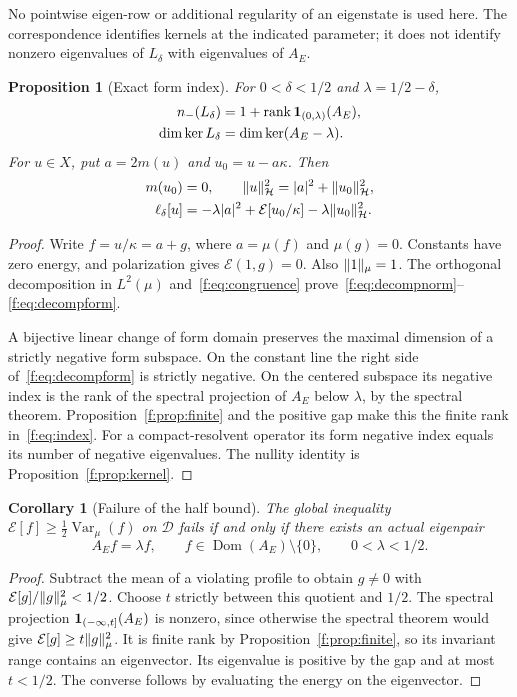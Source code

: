 \documentclass[11pt,a4paper]{article}
\numberwithin{equation}{section}
\newtheorem{proposition}[theorem]{Proposition}
\newtheorem{corollary}[theorem]{Corollary}
\theoremstyle{definition}\newtheorem{definition}[theorem]{Definition}
\theoremstyle{remark}\newtheorem{remark}[theorem]{Remark}
\newcommand{\E}{\mathcal E}\newcommand{\D}{\mathcal D}
\newcommand{\Hh}{\mathcal H}\newcommand{\Hw}{\mathcal H}
\newcommand{\dom}{\operatorname{Dom}}\newcommand{\Var}{\operatorname{Var}}
\newcommand{\rank}{\operatorname{rank}}\newcommand{\ess}{\operatorname{ess}}\newcommand{\supp}{\operatorname{supp}}
\begin{document}
No pointwise eigen-row or additional regularity of an eigenstate is used here. The correspondence identifies kernels at the indicated parameter; it does not identify nonzero eigenvalues of $L_\delta$ with eigenvalues of $A_E$.

\begin{proposition}[Exact form index]\label{f:prop:index}
For $0<\delta<1/2$ and $\lambda=1/2-\delta$,
\begin{align}
 n_-(L_\delta)&=1+\rank\one_{(0,\lambda)}(A_E),\label{f:eq:index}\\
 \dim\ker L_\delta&=\dim\ker(A_E-\lambda).\label{f:eq:nullity}
\end{align}
For $u\in X$, put $a=2m(u)$ and $u_0=u-a\kappa$. Then
\begin{align}
 m(u_0)&=0,\qquad
 \norm{u}_{\Hh}^2=|a|^2+\norm{u_0}_{\Hh}^2,\label{f:eq:decompnorm}\\
 \ell_\delta[u]&=-\lambda|a|^2+
              \E[u_0/\kappa]-\lambda\norm{u_0}_{\Hh}^2.\label{f:eq:decompform}
\end{align}
\end{proposition}
\begin{proof}
Write $f=u/\kappa=a+g$, where $a=\mu(f)$ and $\mu(g)=0$. Constants have zero energy, and polarization gives $\E(1,g)=0$. Also $\lVert1\rVert_\mu=1$. The orthogonal decomposition in $L^2(\mu)$ and~\eqref{f:eq:congruence} prove~\eqref{f:eq:decompnorm}--\eqref{f:eq:decompform}.

A bijective linear change of form domain preserves the maximal dimension of a strictly negative form subspace. On the constant line the right side of~\eqref{f:eq:decompform} is strictly negative. On the centered subspace its negative index is the rank of the spectral projection of $A_E$ below $\lambda$, by the spectral theorem. Proposition~\ref{f:prop:finite} and the positive gap make this the finite rank in~\eqref{f:eq:index}. For a compact-resolvent operator its form negative index equals its number of negative eigenvalues. The nullity identity is Proposition~\ref{f:prop:kernel}.
\end{proof}

\begin{corollary}[Failure of the half bound]\label{f:cor:failure}
The global inequality $\E[f]\ge\tfrac12\Var_\mu(f)$ on $\D$ fails if and only if there exists an actual eigenpair
\[
 A_Ef=\lambda f,\qquad f\in\dom(A_E)\setminus\{0\},\qquad0<\lambda<1/2.
\]
\end{corollary}
\begin{proof}
Subtract the mean of a violating profile to obtain $g\ne0$ with $\E[g]/\norm{g}_\mu^2<1/2$. Choose $t$ strictly between this quotient and $1/2$. The spectral projection $\mathbf1_{(-\infty,t]}(A_E)$ is nonzero, since otherwise the spectral theorem would give $\E[g]\ge t\norm{g}_\mu^2$. It is finite rank by Proposition~\ref{f:prop:finite}, so its invariant range contains an eigenvector. Its eigenvalue is positive by the gap and at most $t<1/2$. The converse follows by evaluating the energy on the eigenvector.
\end{proof}
\end{document}
